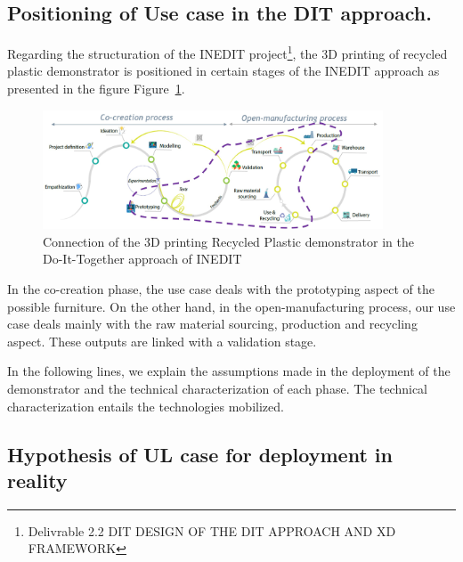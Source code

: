 \documentclass[
  11pt,
]{article}
\begin{document}
\hypertarget{positioning-of-use-case-in-the-dit-approach.}{%
\subsection{Positioning of Use case in the DIT
approach.}\label{positioning-of-use-case-in-the-dit-approach.}}

Regarding the structuration of the INEDIT project\footnote{Delivrable
  2.2 DIT DESIGN OF THE DIT APPROACH AND XD FRAMEWORK}, the 3D printing
of recycled plastic demonstrator is positioned in certain stages of the
INEDIT approach as presented in the figure Figure~\ref{fig-dit-ul}.

\begin{figure}[H]

{\centering \includegraphics[width=0.9\textwidth,height=\textheight]{figures/DIT-UL.jpg}

}

\caption{\label{fig-dit-ul}Connection of the 3D printing Recycled
Plastic demonstrator in the Do-It-Together approach of INEDIT}

\end{figure}

In the co-creation phase, the use case deals with the prototyping aspect
of the possible furniture. On the other hand, in the open-manufacturing
process, our use case deals mainly with the raw material sourcing,
production and recycling aspect. These outputs are linked with a
validation stage.

In the following lines, we explain the assumptions made in the
deployment of the demonstrator and the technical characterization of
each phase. The technical characterization entails the technologies
mobilized.

\hypertarget{hypothesis-of-ul-case-for-deployment-in-reality}{%
\subsection{Hypothesis of UL case for deployment in
reality}\label{hypothesis-of-ul-case-for-deployment-in-reality}}
\end{document}
